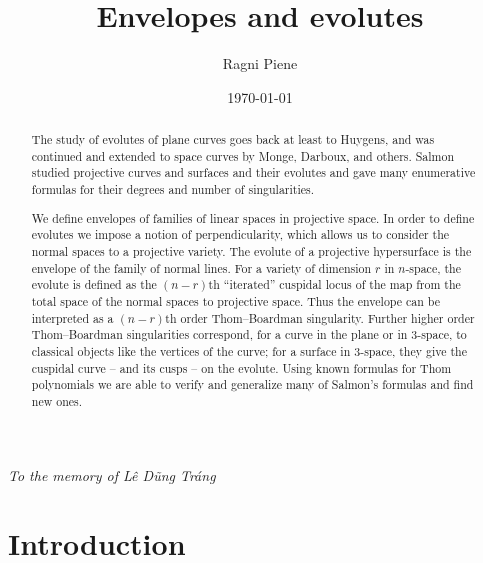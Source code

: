 \documentclass[reqno]{amsart}
\theoremstyle{definition}
\theoremstyle{remark}
\begin{document}
\title{Envelopes and evolutes}
\author[R.~Piene]{Ragni Piene}
\address{Ragni Piene\\Department of Mathematics\\
University of Oslo\\P.O.Box 1053 Blindern\\NO-0316 Oslo\\Norway}

\date{\today}



\begin{abstract}
The study of evolutes of plane curves goes back at least to Huygens, and was continued and extended to space curves by Monge, Darboux, and others. Salmon studied projective curves and surfaces and their evolutes and gave many enumerative formulas for their degrees and number of singularities.

We define envelopes of families of linear spaces in projective space. In order to define evolutes we impose a notion of perpendicularity, which allows us to consider the normal spaces to a projective variety. The evolute of a projective hypersurface is  the envelope of the family of normal lines. For a variety of dimension $r$ in $n$-space, the evolute is defined as the $(n-r)$th ``iterated'' cuspidal locus of the map from the total space of the normal spaces to projective space. Thus the envelope can be interpreted as a $(n-r)$th order Thom--Boardman singularity. Further higher order Thom--Boardman singularities correspond, for a curve in the plane or  in 3-space, to classical objects like the vertices of the curve; for a surface in 3-space, they give the cuspidal curve -- and its cusps -- on the evolute.
Using known formulas for Thom polynomials we are able to verify and generalize many of Salmon's formulas and find new ones.
\end{abstract}


\maketitle

\hfill{\emph{To the memory of L\^e D\~ung Tr\'ang}}

\section{Introduction}
\end{document}
